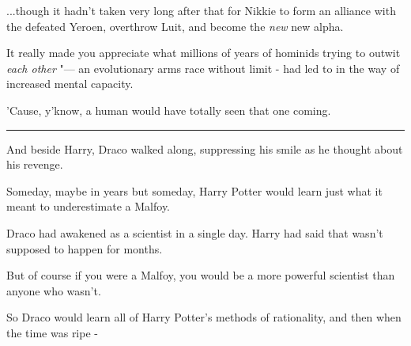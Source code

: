 ...though it hadn't taken very long after that for Nikkie to form
an alliance with the defeated Yeroen, overthrow Luit, and become the
\emph{new} new alpha.

It really made you appreciate what millions of years of hominids trying
to outwit \emph{each other} "--- an evolutionary arms race without limit -
had led to in the way of increased mental capacity.

'Cause, y'know, a human would have totally seen that one coming.

\begin{center}\rule{3in}{0.4pt}\end{center}

And beside Harry, Draco walked along, suppressing his smile as he
thought about his revenge.

Someday, maybe in years but someday, Harry Potter would learn just what
it meant to underestimate a Malfoy.

Draco had awakened as a scientist in a single day. Harry had said that
wasn't supposed to happen for months.

But of course if you were a Malfoy, you would be a more powerful
scientist than anyone who wasn't.

So Draco would learn all of Harry Potter's methods of rationality, and
then when the time was ripe -
